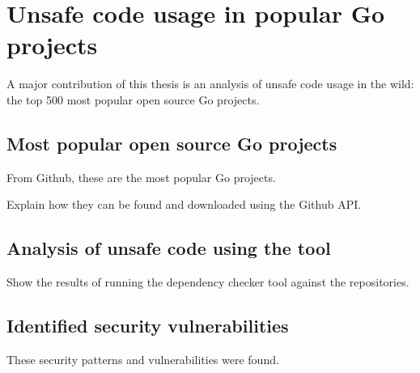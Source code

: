 
\chapter{Unsafe code usage in popular Go projects}\label{ch:survey}

A major contribution of this thesis is an analysis of unsafe code usage in the wild:
the top 500 most popular open source Go projects.



\section{Most popular open source Go projects}\label{sec:most-popular-projects}

From Github, these are the most popular Go projects.

Explain how they can be found and downloaded using the Github API.



\section{Analysis of unsafe code using the tool}\label{sec:survey}

Show the results of running the dependency checker tool against the repositories.



\section{Identified security vulnerabilities}\label{sec:identified-vulnerabilities}

These security patterns and vulnerabilities were found.
